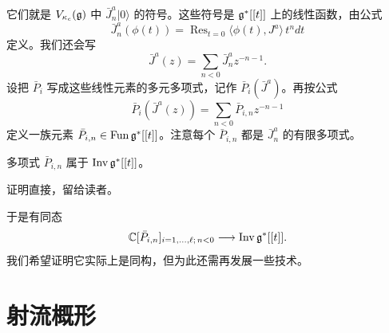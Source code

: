 %

它们就是 $V_{\kappa_c}(\mathfrak{g})$ 中 $\bar J^a_n|0\rangle$ 的符号。这些符号是 $\mathfrak{g}^*[[t]]$ 上的线性函数，由公式
\begin{equation}
    \bar J^a_n(\phi(t)) = \operatorname{Res}_{t=0}\langle \phi(t), J^a\rangle\, t^n dt
    \tag{3.3-4}
\end{equation}
定义。我们还会写
\[
    \bar J^a(z) = \sum_{n<0} \bar J^a_n z^{-n-1}.
\]
设把 $\bar P_i$ 写成这些线性元素的多元多项式，记作 $\bar P_i(\bar J^a)$。再按公式
\[
    \bar P_i(\bar J^a(z)) = \sum_{n<0} \bar P_{i,n} z^{-n-1}
\]
定义一族元素 $\bar P_{i,n}\in\operatorname{Fun}\mathfrak{g}^*[[t]]$。注意每个 $\bar P_{i,n}$ 都是 $\bar J^a_n$ 的有限多项式。

\begin{lemma}
    多项式 $\bar P_{i,n}$ 属于 $\operatorname{Inv}\mathfrak{g}^*[[t]]$。
\end{lemma}

证明直接，留给读者。


于是有同态
\[
    \mathbb{C}[\bar P_{i,n}]_{i=1,\dots,\ell;\,n<0}\longrightarrow\operatorname{Inv}\mathfrak{g}^*[[t]].
\]
我们希望证明它实际上是同构，但为此还需再发展一些技术。

\section{射流概形}

